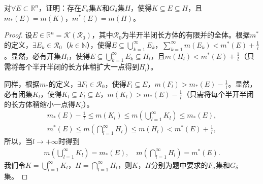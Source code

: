 \documentclass[../../main.tex]{subfiles}%
\begin{document}
\begin{proposition}
对$\forall E\subset\mathbb{R}^n$，证明：存在$F_\sigma$集$K$和$G_\delta$集$H$，使得$K\subseteq E\subseteq H$，且$m_*(E)=m(K)$，$m^*(E)=m(H)$。
\end{proposition}
\begin{proof}

设$E\in\mathbb{R}^n=\mathscr{K}(\mathscr{R}_0)$，其中$\mathscr{R}_0$为半开半闭长方体的有限并的全体。根据$m^*$的定义，$\exists E_k\in\mathscr{R}_0$（$k\in\mathbb{N}$），使得$E\subseteq\bigcup\limits_{k=1}^{\infty}E_k$，$\sum\limits_{k=1}^{\infty}m(E_k)<m^*(E)+\frac{1}{l}$。显然，必有开集$H_l$，使得$E\subseteq\bigcup\limits_{k=1}^{\infty}E_k\subseteq H_l$，且$m(H_l)<m^*(E)+\frac{1}{l}$（只需将每个半开半闭的长方体稍扩大一点得到$H_l$）。

同样，根据$m_*$的定义，$\exists F_l\in\mathscr{R}_0$，使得$F_l\subseteq E$，$m(F_l)>m_*(E)-\frac{1}{l}$。显然，必有闭集$K_l$，使得$K_l\subseteq F_l\subseteq E$，$m(K_l)>m_*(E)-\frac{1}{l}$（只需将每个半开半闭的长方体稍缩小一点得$K_l$）。
\begin{gather*}
m_*(E)-\frac{1}{l} \leqslant m(K_l)\leqslant m\left(\bigcup\limits_{l=1}^{\infty}K_l\right)\leqslant m_*(E), \\
m^*(E) \leqslant m\left(\bigcap\limits_{l=1}^{\infty}H_l\right)\leqslant m(H_l)<m^*(E)+\frac{1}{l},
\end{gather*}
所以，当$l\to+\infty$时得到
\begin{align*}
m\left(\bigcup\limits_{l=1}^{\infty}K_l\right) = m_*(E),\quad m\left(\bigcap\limits_{l=1}^{\infty}H_l\right) = m^*(E).
\end{align*}
我们令$K=\bigcup\limits_{l=1}^{\infty}K_l$，$H=\bigcap\limits_{l=1}^{\infty}H_l$，则$K$，$H$分别为题中要求的$F_\sigma$集和$G_\delta$集。

\end{proof}
\end{document}
